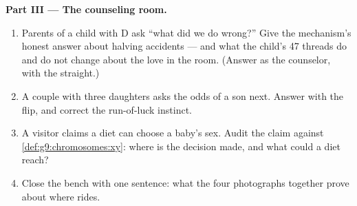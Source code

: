 \begin{problem}
\medskip\noindent\textbf{Part III --- The counseling
room.}
\begin{enumerate}[resume]
  \item Parents of a child with  D ask ``what
        did we do wrong?'' Give the mechanism's honest
        answer about halving accidents --- and what the
        child's 47 threads do and do not change about the
        love in the room. (Answer as the counselor, with
        the  straight.)
  \item A couple with three daughters asks the odds of a
        son next. Answer with the flip, and correct the
        run-of-luck instinct.
  \item A visitor claims a diet can choose a baby's sex.
        Audit the claim against
        \cref{def:g9:chromosomes:xy}: where is the
        decision made, and what could a diet reach?
  \item Close the bench with one sentence: what the
        four photographs together prove about where
         rides.
\end{enumerate}
\end{problem}
